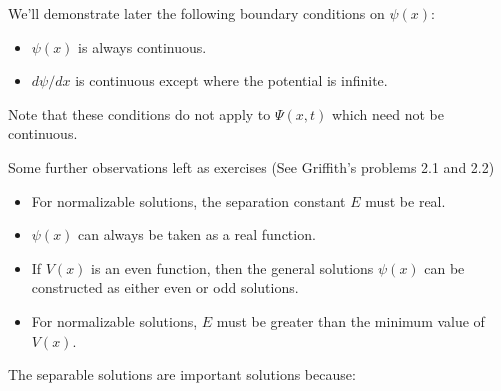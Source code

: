 \documentclass[12pt]{book}
\begin{document}
We'll demonstrate later the following boundary conditions on $\psi(x)$:
\begin{itemize}
\item $\psi(x)$ is always continuous.
\item $d\psi/dx$ is continuous except where the potential is infinite.
\end{itemize}
Note that these conditions do not apply to $\Psi(x,t)$ which need not be continuous.

Some further observations left as exercises (See Griffith's problems 2.1 and 2.2)
\begin{itemize}
\item For normalizable solutions, the separation constant $E$ must be real.
\item $\psi(x)$ can always be taken as a real function.
\item If $V(x)$ is an even function, then the general solutions $\psi(x)$ can be constructed as either even or odd solutions.
\item For normalizable solutions, $E$ must be greater than the minimum value of $V(x)$.
\end{itemize}
\noindent
The separable solutions are important solutions because:
\end{document}
